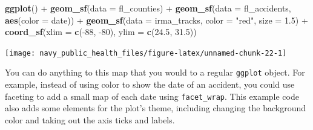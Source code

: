 \documentclass[]{tufte-book}
\newenvironment{Shaded}{}{}
\newcommand{\DataTypeTok}[1]{\textcolor[rgb]{0.56,0.13,0.00}{#1}}
\newcommand{\DecValTok}[1]{\textcolor[rgb]{0.25,0.63,0.44}{#1}}
\newcommand{\FloatTok}[1]{\textcolor[rgb]{0.25,0.63,0.44}{#1}}
\newcommand{\KeywordTok}[1]{\textcolor[rgb]{0.00,0.44,0.13}{\textbf{#1}}}
\newcommand{\NormalTok}[1]{#1}
\newcommand{\OperatorTok}[1]{\textcolor[rgb]{0.40,0.40,0.40}{#1}}
\newcommand{\StringTok}[1]{\textcolor[rgb]{0.25,0.44,0.63}{#1}}
\begin{document}
\begin{Shaded}
\begin{Highlighting}[]
\KeywordTok{ggplot}\NormalTok{() }\OperatorTok{+}\StringTok{ }\KeywordTok{geom_sf}\NormalTok{(}\DataTypeTok{data =}\NormalTok{ fl_counties) }\OperatorTok{+}\StringTok{ }\KeywordTok{geom_sf}\NormalTok{(}\DataTypeTok{data =}\NormalTok{ fl_accidents, }
    \KeywordTok{aes}\NormalTok{(}\DataTypeTok{color =}\NormalTok{ date)) }\OperatorTok{+}\StringTok{ }\KeywordTok{geom_sf}\NormalTok{(}\DataTypeTok{data =}\NormalTok{ irma_tracks, }
    \DataTypeTok{color =} \StringTok{"red"}\NormalTok{, }\DataTypeTok{size =} \FloatTok{1.5}\NormalTok{) }\OperatorTok{+}\StringTok{ }\KeywordTok{coord_sf}\NormalTok{(}\DataTypeTok{xlim =} \KeywordTok{c}\NormalTok{(}\OperatorTok{-}\DecValTok{88}\NormalTok{, }
    \DecValTok{-80}\NormalTok{), }\DataTypeTok{ylim =} \KeywordTok{c}\NormalTok{(}\FloatTok{24.5}\NormalTok{, }\FloatTok{31.5}\NormalTok{))}
\end{Highlighting}
\end{Shaded}

\texttt{[image: navy\_public\_health\_files/figure-latex/unnamed-chunk-22-1]}

You can do anything to this map that you would to a regular \texttt{ggplot} object. For example, instead of
using color to show the date of an accident, you could use faceting to add a small map of each date
using \texttt{facet\_wrap}. This example code also adds some elements for the plot's theme, including
changing the background color and taking out the axis ticks and labels.
\end{document}
